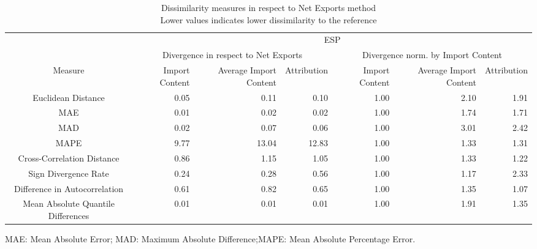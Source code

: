 \begin{table}[t]
\caption*{
{\large Dissimilarity measures in respect to Net Exports method} \\ 
{\small Lower values indicates lower dissimilarity to the reference}
} 
\fontsize{15.0pt}{18.0pt}\selectfont
\begin{tabular*}{\linewidth}{@{\extracolsep{\fill}}crrrrrr}
\toprule
 & \multicolumn{6}{c}{ESP} \\ 
\cmidrule(lr){2-7}
 & \multicolumn{3}{c}{Divergence in respect to Net Exports} & \multicolumn{3}{c}{Divergence norm. by Import Content} \\ 
\cmidrule(lr){2-4} \cmidrule(lr){5-7}
Measure & Import Content & Average Import Content & Attribution & Import Content & Average Import Content & Attribution \\ 
\midrule\addlinespace[2.5pt]
Euclidean Distance & 0.05 & 0.11 & 0.10 & 1.00 & 2.10 & 1.91 \\ 
MAE & 0.01 & 0.02 & 0.02 & 1.00 & 1.74 & 1.71 \\ 
MAD & 0.02 & 0.07 & 0.06 & 1.00 & 3.01 & 2.42 \\ 
MAPE & 9.77 & 13.04 & 12.83 & 1.00 & 1.33 & 1.31 \\ 
Cross-Correlation Distance & 0.86 & 1.15 & 1.05 & 1.00 & 1.33 & 1.22 \\ 
Sign Divergence Rate & 0.24 & 0.28 & 0.56 & 1.00 & 1.17 & 2.33 \\ 
Difference in Autocorrelation & 0.61 & 0.82 & 0.65 & 1.00 & 1.35 & 1.07 \\ 
Mean Absolute Quantile Differences & 0.01 & 0.01 & 0.01 & 1.00 & 1.91 & 1.35 \\ 
\bottomrule
\end{tabular*}
\begin{minipage}{\linewidth}
MAE: Mean Absolute Error; MAD: Maximum Absolute Difference;MAPE: Mean Absolute Percentage Error.\\
\end{minipage}
\end{table}

